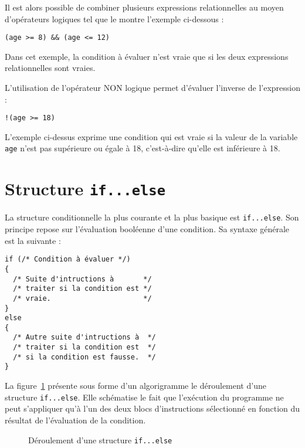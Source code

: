 \documentclass[DIV=calc,paper=a4,fontsize=11pt,twocolumn,halfparskip,parindent]{scrartcl} %
\begin{document}
Il est alors possible de combiner plusieurs expressions relationnelles au moyen d'opérateurs logiques tel que le montre l'exemple ci-dessous :
\begin{lstlisting}[frame=single]
(age >= 8) && (age <= 12)
\end{lstlisting}

Dans cet exemple, la condition à évaluer n'est vraie que si les deux expressions relationnelles sont vraies.

L'utilisation de l'opérateur NON logique permet d'évaluer l'inverse de l'expression :
\begin{lstlisting}[frame=single]
!(age >= 18)
\end{lstlisting}

L'exemple ci-dessus exprime une condition qui est vraie si la valeur de la variable \texttt{age} n'est pas supérieure ou égale à 18, c'est-à-dire qu'elle est
inférieure à 18. 

\section*{Structure \texttt{\textbf{if...else}}}
La structure conditionnelle la plus courante et la plus basique est \texttt{if...else}. Son principe repose sur l’évaluation booléenne d’une condition. Sa syntaxe
générale est la suivante :
\begin{lstlisting}[frame=single]
if (/* Condition à évaluer */)
{
  /* Suite d'intructions à       */
  /* traiter si la condition est */
  /* vraie.                      */
}
else
{
  /* Autre suite d'intructions à  */
  /* traiter si la condition est  */
  /* si la condition est fausse.  */
}
\end{lstlisting}

La figure~\ref{ifelse} présente sous forme d'un algorigramme le déroulement d'une structure \texttt{if...else}. Elle schématise le fait que l'exécution du
programme ne peut s'appliquer qu'à l'un des deux blocs d'instructions sélectionné en fonction du résultat de l'évaluation de la condition.
\begin{figure}[!h]
\centering
{}
\caption{Déroulement d'une structure \texttt{if...else}}\label{ifelse}
\end{figure}
\end{document}
